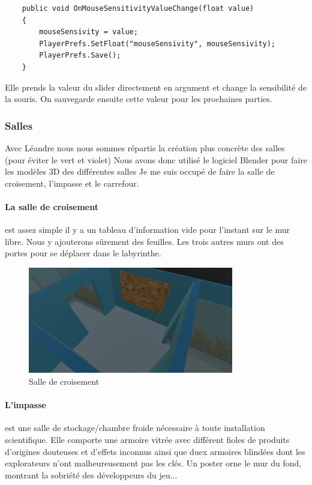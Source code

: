 \documentclass{article}
\begin{document}
\par\vspace{0.2cm}
\begin{lstlisting}
    public void OnMouseSensitivityValueChange(float value)
    {
        mouseSensivity = value;
        PlayerPrefs.SetFloat("mouseSensivity", mouseSensivity);
        PlayerPrefs.Save();
    }
\end{lstlisting}

Elle prends la valeur du slider directement en argument et change la sensibilité de la souris. On sauvegarde ensuite cette valeur pour les prochaines parties.

\subsubsection{Salles}
Avec Léandre nous nous sommes répartis la création plus concrète des salles (pour éviter le vert et violet) Nous avons donc utilisé le logiciel Blender pour faire les modèles 3D des différentes salles
Je me suis occupé de faire la salle de croisement, l'impasse et le carrefour.

\paragraph{La salle de croisement}\hspace{-0.2cm}est assez simple il y a un tableau d'information vide pour l'instant sur le mur libre. Nous y ajouterons sûrement des feuilles. Les trois autres murs ont des portes pour se déplacer dans le labyrinthe.

\begin{figure}[!h]
    \centering
    \includegraphics[width=0.8\textwidth]{salle_croisement.png}
    \caption{Salle de croisement}
    \label{salle de croisement}
\end{figure}

\paragraph{L'impasse}\hspace{-0.2cm}est une salle de stockage/chambre froide nécessaire à toute installation scientifique. Elle comporte une armoire vitrée avec différent fioles de produits d'origines douteuses et d'effets inconnus ainsi que duex armoires blindées dont les explorateurs n'ont malheureusement pas les clés. Un poster orne le mur du fond, montrant la sobriété des développeurs du jeu...
\end{document}
